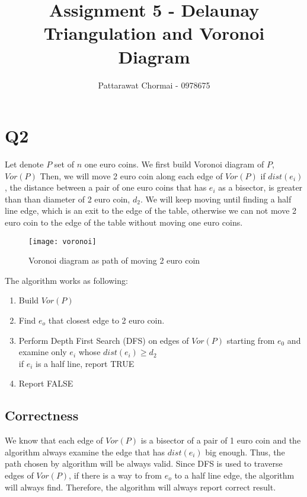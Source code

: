 \documentclass[12pt]{article}
\begin{document}
\title{Assignment 5 - Delaunay Triangulation and Voronoi Diagram }
\author{
	Pattarawat Chormai - 0978675 \\
}
\maketitle

\section*{Q2}
Let denote $P$ set of $n$ one euro coins. We first build Voronoi diagram of $P$, $Vor(P)$
Then, we will move 2 euro coin along each edge of $Vor(P)$ if $dist(e_i)$, the distance between a pair
of one euro coins that has $e_i$ as a bisector, is greater than than diameter of 2 euro coin,
$d_{2}$.
We will keep moving until finding a half line edge, which is an exit to the edge of the table,
otherwise we can not move 2 euro coin to the edge of the table without moving 
one euro coins.

\begin{center}
    \label{figure1}
    \begin{figure}[h]
    \centering
    \texttt{[image: voronoi]}\\
    \caption{Voronoi diagram as path of moving 2 euro coin } \label{fig:voronoi}
    \end{figure}
\end{center}

The algorithm works as following:
\begin{enumerate}
    \item Build $Vor(P)$
    \item Find $e_o$ that closest edge to 2 euro coin.
    \item Perform Depth First Search (DFS) on edges of $Vor(P)$ starting from $e_0$ and examine only $e_i$ whose $dist(e_i) \ge d_2$ \\
       if $e_i$ is a half line, report TRUE
    \item Report FALSE
\end{enumerate}


\subsection*{Correctness}
We know that each edge of $Vor(P)$ is a bisector of a pair of 1 euro coin and the algorithm
always examine the edge that has $dist(e_i)$ big enough. Thus, the path chosen by algorithm
will be always valid. Since DFS is used to traverse edges of $Vor(P)$, if there is a way
to from $e_o$ to a half line edge, the algorithm will always find. Therefore, the algorithm
will always report correct result.
\end{document}
